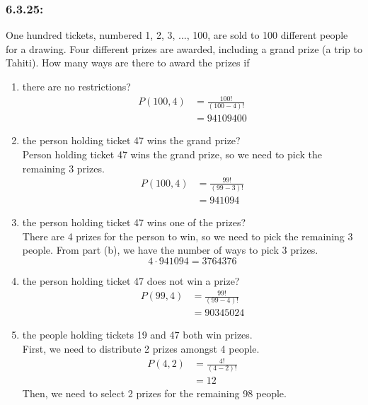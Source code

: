 \documentclass[a4paper]{article}
\begin{document}
\subsubsection*{6.3.25:}
One hundred tickets, numbered 1, 2, 3, ..., 100, are sold to 100 different people for a drawing. Four different prizes are awarded, including a grand prize (a trip to Tahiti). How many ways are there to award the prizes if
\begin{enumerate}[label = \textbf{\alph*)}]
	\item there are no restrictions?
	      \begin{align*}
		      P(100,4) & = \frac{100!}{(100-4)!} \\
		               & = 94109400
	      \end{align*}
	\item the person holding ticket 47 wins the grand prize? \\
	      Person holding ticket 47 wins the grand prize, so we need to pick the remaining 3 prizes.
	      \begin{align*}
		      P(100,4) & = \frac{99!}{(99-3)!} \\
		               & = 941094
	      \end{align*}
	\item the person holding ticket 47 wins one of the prizes? \\
	      There are 4 prizes for the person to win, so we need to pick the remaining 3 people. From part (b), we have the number of ways to pick 3 prizes.
	      \begin{equation*}
		      4 \cdot 941094 = 3764376
	      \end{equation*}
	\item the person holding ticket 47 does not win a prize?
	      \begin{align*}
		      P(99,4) & = \frac{99!}{(99-4)!} \\
		              & = 90345024
	      \end{align*}
	\item the people holding tickets 19 and 47 both win prizes. \\
	      First, we need to distribute 2 prizes amongst 4 people.
	      \begin{align*}
		      P(4,2) & = \frac{4!}{(4-2)!} \\
		             & = 12
	      \end{align*}
	      Then, we need to select 2 prizes for the remaining 98 people.
	      \begin{align*}

\end{align*}
\end{enumerate}
\end{document}
